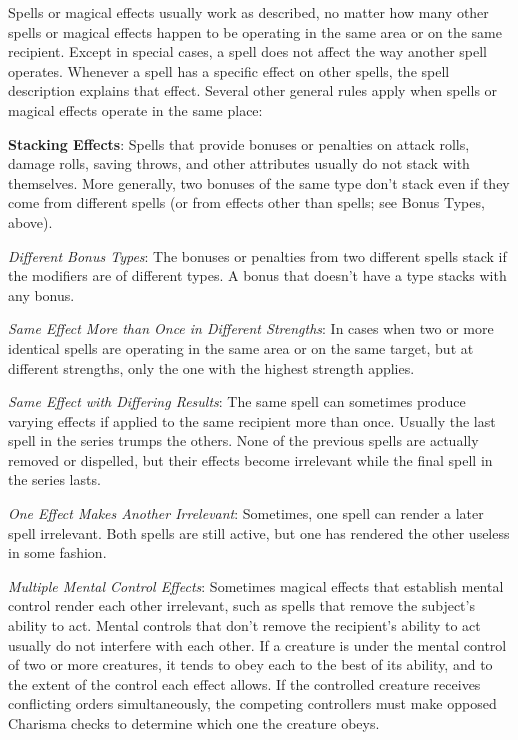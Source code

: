 Spells or magical effects usually work as described, no matter how many other spells or magical effects happen to be operating in the same area or on the same recipient. Except in special cases, a spell does not affect the way another spell operates. Whenever a spell has a specific effect on other spells, the spell description explains that effect. Several other general rules apply when spells or magical effects operate in the same place:

\textbf{Stacking Effects}: Spells that provide bonuses or penalties on attack rolls, damage rolls, saving throws, and other attributes usually do not stack with themselves. More generally, two bonuses of the same type don't stack even if they come from different spells (or from effects other than spells; see Bonus Types, above). 

\textit{Different Bonus Types}: The bonuses or penalties from two different spells stack if the modifiers are of different types. A bonus that doesn't have a type stacks with any bonus.

\textit{Same Effect More than Once in Different Strengths}: In cases when two or more identical spells are operating in the same area or on the same target, but at different strengths, only the one with the highest strength applies.

\textit{Same Effect with Differing Results}: The same spell can sometimes produce varying effects if applied to the same recipient more than once. Usually the last spell in the series trumps the others. None of the previous spells are actually removed or dispelled, but their effects become irrelevant while the final spell in the series lasts.

\textit{One Effect Makes Another Irrelevant}: Sometimes, one spell can render a later spell irrelevant. Both spells are still active, but one has rendered the other useless in some fashion.

\textit{Multiple Mental Control Effects}: Sometimes magical effects that establish mental control render each other irrelevant, such as spells that remove the subject's ability to act. Mental controls that don't remove the recipient's ability to act usually do not interfere with each other. If a creature is under the mental control of two or more creatures, it tends to obey each to the best of its ability, and to the extent of the control each effect allows. If the controlled creature receives conflicting orders simultaneously, the competing controllers must make opposed Charisma checks to determine which one the creature obeys.

